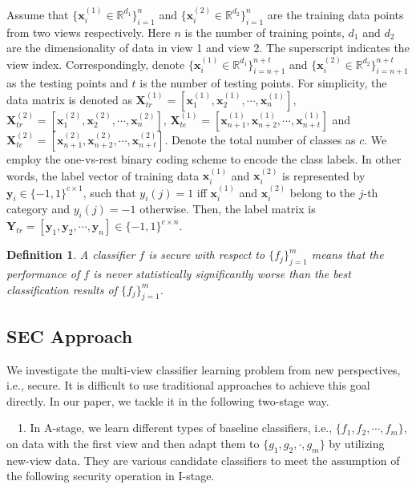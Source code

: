 \documentclass[10pt,journal,compsoc]{IEEEtran}
\newtheorem{lemma}{Definition}
\begin{document}
Assume that $\{\mathbf{x}_i^{(1)} \in \mathbb{R}^{d_1} \}_{i=1}^n$ and $\{\mathbf{x}_i^{(2)} \in \mathbb{R}^{d_2} \}_{i=1}^n$ are the training data points from two views respectively. Here $n$ is the number of training points, $d_1$ and $d_2$ are the dimensionality of data in view 1 and view 2. The superscript indicates the view index. Correspondingly, denote $\{\mathbf{x}_i^{(1)} \in \mathbb{R}^{d_1} \}_{i=n+1}^{n+t}$ and $\{\mathbf{x}_i^{(2)} \in \mathbb{R}^{d_2} \}_{i=n+1}^{n+t}$ as the testing points and $t$ is the number of testing points. For simplicity, the data matrix is denoted as
$\mathbf{X}_{tr}^{(1)} = [\mathbf{x}_1^{(1)},\mathbf{x}_2^{(1)},\cdots,\mathbf{x}_n^{(1)}]$,
$\mathbf{X}_{tr}^{(2)} = [\mathbf{x}_1^{(2)},\mathbf{x}_2^{(2)},\cdots,\mathbf{x}_n^{(2)}]$,
$\mathbf{X}_{te}^{(1)} = [\mathbf{x}_{n+1}^{(1)},\mathbf{x}_{n+2}^{(1)},\cdots,\mathbf{x}_{n+t}^{(1)}]$ and
$\mathbf{X}_{te}^{(2)} = [\mathbf{x}_{n+1}^{(2)},\mathbf{x}_{n+2}^{(2)},\cdots,\mathbf{x}_{n+t}^{(2)}]$.
Denote the total number of classes as $c$. We employ the one-vs-rest binary coding scheme to encode the class labels. In other words, the label vector of training data $\mathbf{x}_i^{(1)}$ and $\mathbf{x}_i^{(2)}$  is represented by $\mathbf{y}_i \in \{-1, 1\}^{c\times 1}$, such that $y_i(j)=1$ iff $\mathbf{x}_i^{(1)}$ and $\mathbf{x}_i^{(2)}$ belong to the $j$-th category and $y_i(j)=-1$ otherwise. Then, the label matrix is $\mathbf{Y}_{tr}=[\mathbf{y}_1,\mathbf{y}_2, \cdots,\mathbf{y}_n] \in \{-1,1\}^{c\times n}$.

\begin{lemma}
A classifier $f$ is secure with respect to $\{f_j\}_{j=1}^m$ means that the performance of $f$ is never statistically significantly worse
than the best classification results of $\{f_j\}_{j=1}^m$.
\end{lemma}

\subsection{SEC Approach}

We investigate the multi-view classifier learning problem from new perspectives, i.e., secure. It is difficult to use traditional approaches to achieve this goal directly. In our paper, we tackle it in the following two-stage way.

~~1. In A-stage, we learn different types of baseline classifiers, i.e., $\{f_1, f_2, \cdots, f_m\}$, on data with the first view and then adapt them to $\{g_1, g_2,\cdot, g_m\}$ by utilizing new-view data. They are various candidate classifiers to meet the assumption of the following security operation in I-stage.
\end{document}
